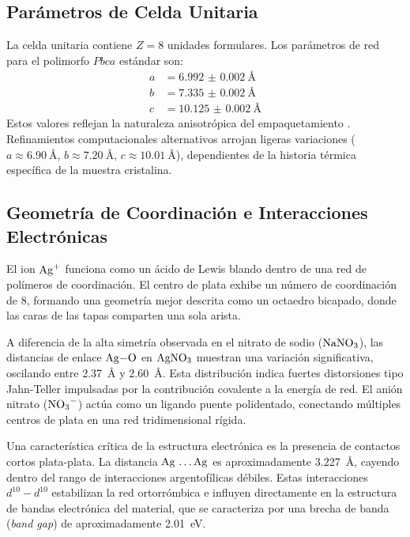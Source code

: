 \documentclass[pdflatex,sn-mathphys-num,draft]{sn-jnl}
\theoremstyle{thmstyleone}%
\theoremstyle{thmstyletwo}%
\theoremstyle{thmstylethree}%
\begin{document}
\subsection{Parámetros de Celda Unitaria}
La celda unitaria contiene $Z=8$ unidades formulares. Los parámetros de red para
el polimorfo $Pbca$ estándar son:
\begin{align}
  a &= \qty{6.992(2)}{\angstrom} \\
  b &= \qty{7.335(2)}{\angstrom} \\
  c &= \qty{10.125(2)}{\angstrom}
\end{align}
Estos valores reflejan la naturaleza anisotrópica del empaquetamiento
\cite{osti_1279797, Persson2012}.
Refinamientos computacionales alternativos arrojan ligeras variaciones ($a
\approx \qty{6.90}{\angstrom}$, $b \approx \qty{7.20}{\angstrom}$, $c \approx
\qty{10.01}{\angstrom}$), dependientes de la historia térmica específica de la
muestra cristalina.

\subsection{Geometría de Coordinación e Interacciones Electrónicas}
El ion $\ce{Ag+}$ funciona como un ácido de Lewis blando dentro de una red de
polímeros de coordinación. El centro de plata exhibe un número de coordinación
de 8, formando una geometría mejor descrita como un octaedro bicapado, donde las
caras de las tapas comparten una sola arista.

A diferencia de la alta simetría observada en el nitrato de sodio ($\ce{NaNO3}$),
las distancias de enlace $\ce{Ag-O}$ en $\ce{AgNO3}$ muestran una variación
significativa, oscilando entre \qty{2.37}{\angstrom} y \qty{2.60}{\angstrom}.
Esta distribución indica fuertes distorsiones tipo Jahn-Teller impulsadas por la
contribución covalente a la energía de red. El anión nitrato ($\ce{NO3-}$) actúa
como un ligando puente polidentado, conectando múltiples centros de plata en una
red tridimensional rígida.

Una característica crítica de la estructura electrónica es la presencia de
contactos cortos plata-plata. La distancia $\ce{Ag \dots Ag}$ es
aproximadamente \qty{3.227}{\angstrom}, cayendo dentro del rango de
interacciones argentofílicas débiles. Estas interacciones $d^{10}-d^{10}$
estabilizan la red ortorrómbica e influyen directamente en la estructura de
bandas electrónica del material, que se caracteriza por una brecha de banda
(\textit{band gap}) de aproximadamente \qty{2.01}{\electronvolt}.
\end{document}
